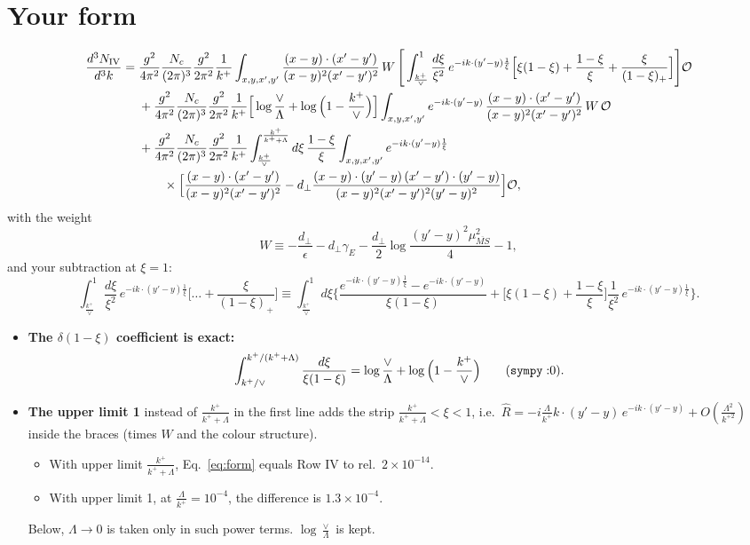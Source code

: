\documentclass[10pt]{article}
\numberwithin{equation}{section}
\newcommand{\OO}{\mathcal O}
\newcommand{\pre}{\frac{g^{2}}{4\pi^{2}}\frac{N_{c}}{(2\pi)^{3}}\frac{g^{2}}{2\pi^{2}}\frac{1}{k^{+}}}
\newcommand{\XX}{\frac{(x-y)\cdot(x'-y')}{(x-y)^{2}(x'-y')^{2}}}
\newcommand{\ph}{e^{-ik\cdot(y'-y)\frac{1}{\xi}}}
\newcommand{\phone}{e^{-ik\cdot(y'-y)}}
\begin{document}
\section{Your form}\label{sec:form}
\begin{align}
\frac{d^{3}N_{\rm IV}}{d^{3}k}={}&\pre\int_{x,y,x',y'}\XX\,W\,\Bigg[\int_{\frac{k^{+}}{\vee}}^{1}\frac{d\xi}{\xi^{2}}\,\ph\Big[\xi(1-\xi)+\frac{1-\xi}{\xi}+\frac{\xi}{(1-\xi)_{+}}\Big]\Bigg]\OO\notag\\
&+\pre\Big[\log\frac{\vee}{\Lambda}+\log\Big(1-\frac{k^{+}}{\vee}\Big)\Big]\int_{x,y,x',y'}\phone\,\XX\,W\,\OO\notag\\
&+\pre\int_{\frac{k^{+}}{\vee}}^{\frac{k^{+}}{k^{+}+\Lambda}}d\xi\,\frac{1-\xi}{\xi}\int_{x,y,x',y'}\ph\notag\\
&\qquad\times\Big[\XX-d_\perp\frac{(x-y)\cdot(y'-y)\,(x'-y')\cdot(y'-y)}{(x-y)^{2}(x'-y')^{2}(y'-y)^{2}}\Big]\OO ,
\label{eq:form}
\end{align}
with the weight
\begin{equation}
W\equiv-\frac{d_{\perp}}{\epsilon}-d_{\perp}\gamma_{E}-\frac{d_{\perp}}{2}\log\frac{(y'-y)^{2}\mu^{2}_{\overline{MS}}}{4}-1 ,
\end{equation}
and your subtraction at $\xi=1$:
\begin{equation}
\int_{\frac{k^{+}}{\vee}}^{1}\frac{d\xi}{\xi^{2}}\,\ph\Big[\dots+\frac{\xi}{(1-\xi)_{+}}\Big]\equiv\int_{\frac{k^{+}}{\vee}}^{1}d\xi\bigg\{\frac{\ph-\phone}{\xi(1-\xi)}+\Big[\xi(1-\xi)+\frac{1-\xi}{\xi}\Big]\frac{1}{\xi^2}\,\ph\bigg\}.
\label{eq:usub}
\end{equation}
\begin{itemize}
\item \textbf{The $\delta(1-\xi)$ coefficient is exact:}
\begin{equation*}
\int_{k^+/\vee}^{k^+/(k^++\Lambda)}\frac{d\xi}{\xi(1-\xi)}=\log\frac{\vee}{\Lambda}+\log\Big(1-\frac{k^+}{\vee}\Big)\qquad(\texttt{sympy}: $0$).
\end{equation*}
\item \textbf{The upper limit 1} instead of $\frac{k^+}{k^++\Lambda}$ in the first line adds the strip $\frac{k^+}{k^++\Lambda}<\xi<1$, i.e.\ $\hat R=-i\frac{\Lambda}{k^+}k\cdot(y'-y)\,e^{-ik\cdot(y'-y)}+O(\frac{\Lambda^2}{k^{+2}})$ inside the braces (times $W$ and the colour structure).
\begin{itemize}
\item With upper limit $\frac{k^+}{k^++\Lambda}$, Eq.~\eqref{eq:form} equals Row IV to rel.\ $2\times10^{-14}$.
\item With upper limit 1, at $\frac{\Lambda}{k^+}=10^{-4}$, the difference is $1.3\times10^{-4}$.
\end{itemize}
Below, $\Lambda\to0$ is taken only in such power terms. $\log\frac{\vee}{\Lambda}$ is kept.
\end{itemize}
\end{document}
